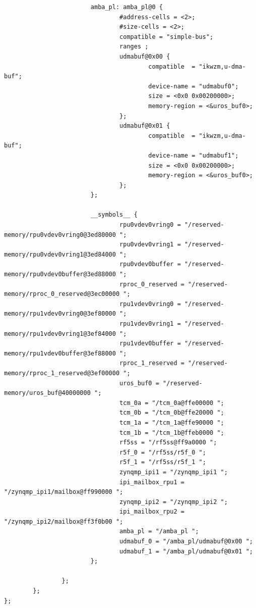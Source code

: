 \documentclass[10pt]{article}
\begin{document}
\begin{verbatim}
                        amba_pl: amba_pl@0 {
                                #address-cells = <2>;
                                #size-cells = <2>;
                                compatible = "simple-bus";
                                ranges ;
                                udmabuf@0x00 {
                                        compatible  = "ikwzm,u-dma-buf";
                                        device-name = "udmabuf0";
                                        size = <0x0 0x00200000>;
                                        memory-region = <&uros_buf0>;
                                };
                                udmabuf@0x01 {
                                        compatible  = "ikwzm,u-dma-buf";
                                        device-name = "udmabuf1";
                                        size = <0x0 0x00200000>;
                                        memory-region = <&uros_buf0>;
                                };
                        };

                        __symbols__ {
                                rpu0vdev0vring0 = "/reserved-memory/rpu0vdev0vring0@3ed80000 ";
                                rpu0vdev0vring1 = "/reserved-memory/rpu0vdev0vring1@3ed84000 ";
                                rpu0vdev0buffer = "/reserved-memory/rpu0vdev0buffer@3ed88000 ";
                                rproc_0_reserved = "/reserved-memory/rproc_0_reserved@3ec00000 ";
                                rpu1vdev0vring0 = "/reserved-memory/rpu1vdev0vring0@3ef80000 ";
                                rpu1vdev0vring1 = "/reserved-memory/rpu1vdev0vring1@3ef84000 ";
                                rpu1vdev0buffer = "/reserved-memory/rpu1vdev0buffer@3ef88000 ";
                                rproc_1_reserved = "/reserved-memory/rproc_1_reserved@3ef00000 ";
                                uros_buf0 = "/reserved-memory/uros_buf@40000000 ";
                                tcm_0a = "/tcm_0a@ffe00000 ";
                                tcm_0b = "/tcm_0b@ffe20000 ";
                                tcm_1a = "/tcm_1a@ffe90000 ";
                                tcm_1b = "/tcm_1b@ffeb0000 ";
                                rf5ss = "/rf5ss@ff9a0000 ";
                                r5f_0 = "/rf5ss/r5f_0 ";
                                r5f_1 = "/rf5ss/r5f_1 ";
                                zynqmp_ipi1 = "/zynqmp_ipi1 ";
                                ipi_mailbox_rpu1 = "/zynqmp_ipi1/mailbox@ff990000 ";
                                zynqmp_ipi2 = "/zynqmp_ipi2 ";
                                ipi_mailbox_rpu2 = "/zynqmp_ipi2/mailbox@ff3f0b00 ";
                                amba_pl = "/amba_pl ";
                                udmabuf_0 = "/amba_pl/udmabuf@0x00 ";
                                udmabuf_1 = "/amba_pl/udmabuf@0x01 ";
                        };

                };
        };
};
\end{verbatim}
\end{document}
